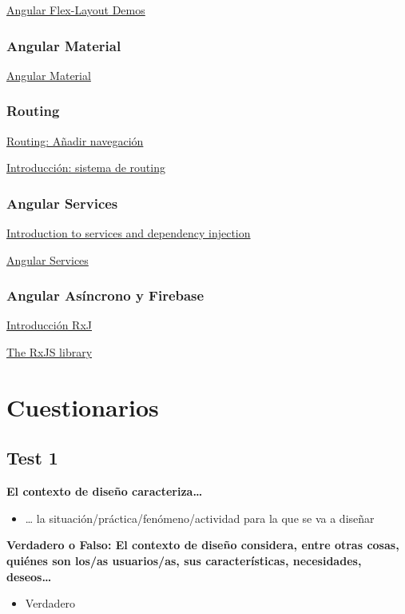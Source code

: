 \documentclass[12pt]{report} %
\begin{document}
\href{https://tburleson-layouts-demos.firebaseapp.com/#/docs}{Angular Flex-Layout Demos}

\subsection{Angular Material}
\href{https://material.angular.io/}{Angular Material}

\subsection{Routing}
\href{https://angular.io/start/start-routing}{Routing: Añadir navegación}

\href{https://desarrolloweb.com/articulos/introduccion-sistema-routing-angular.html}{Introducción: sistema de routing}

\subsection{Angular Services}
\href{https://angular.io/guide/architecture-services}{Introduction to services and dependency injection}

\href{https://desarrolloweb.com/articulos/servicios-angular.html}{Angular Services}

\subsection{Angular Asíncrono y Firebase}
\href{https://rxjs-dev.firebaseapp.com/guide/overview}{Introducción RxJ}

\href{https://angular.io/guide/rx-library}{The RxJS library}

\chapter{Cuestionarios}

\section{Test 1}

\textbf{El contexto de diseño caracteriza\ldots{}}
\begin{itemize}
  \item \ldots{} la situación/práctica/fenómeno/actividad para la que se va a diseñar
\end{itemize}

\textbf{Verdadero o Falso: El contexto de diseño considera, entre otras cosas, quiénes son los/as usuarios/as, sus características, necesidades, deseos\ldots{}}
\begin{itemize}
  \item Verdadero
\end{itemize}
\end{document}

